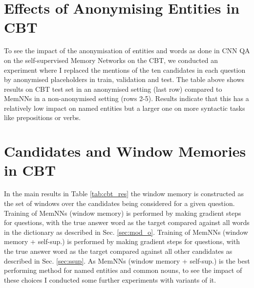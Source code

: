 \section{Effects of Anonymising Entities in CBT} \label{ap:anon}
%
  \begin{center}
    \vspace*{-4ex}
  \end{center}

  To see the impact of the anonymisation of entities and words as done
  in CNN QA on the self-supervised Memory Networks on the CBT, we
  conducted an experiment where I replaced the mentions of the ten
  candidates in each question by anonymised placeholders in train,
  validation and test. The table above shows results on CBT test set
  in an anonymised setting (last row) compared to MemNNs in a
  non-anonymised setting (rows 2-5).  Results indicate that this has a
  relatively low impact on named entities but a larger one on more
  syntactic tasks like prepositions or verbs.





\section{Candidates and Window Memories in CBT} \label{ap:nonsparse-windows}

In the main results in Table \ref{tab:cbt_res} the window memory is constructed as the set of windows
over the candidates being considered for a given question.
Training of {\sc MemNNs (window memory)} is performed by making gradient steps for questions, with 
the true answer word as the target compared against all words in the dictionary as described in Sec. \ref{sec:mod_o}.
Training of {\sc MemNNs  (window memory + self-sup.)} is performed by making gradient steps for questions, 
with the true answer word as the target compared against all other candidates as described in Sec. \ref{sec:ssup}.
As {\sc MemNNs  (window memory + self-sup.)} is the best performing method for named entities and common nouns, 
to see the impact of these choices I conducted some further experiments with variants of it.

